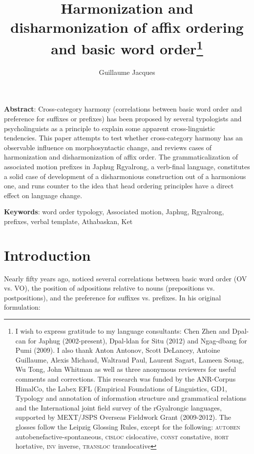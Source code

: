 \documentclass[oldfontcommands,twoside,a4paper,12pt]{article}
\begin{document}
  \title{Harmonization and disharmonization of affix ordering and basic word order\footnote{I wish to express gratitude to my language consultants: Chen Zhen and Dpal-can for Japhug (2002-present), Dpal-ldan for Situ (2012) and Ngag-dbang for Pumi (2009). I also thank Anton Antonov, Scott DeLancey, Antoine Guillaume, Alexis Michaud, Waltraud Paul, Laurent Sagart, Lameen Souag, Wu Tong, John Whitman as well as three anonymous reviewers for useful comments and corrections. This research was funded by the ANR-Corpus HimalCo, the Labex EFL (Empirical Foundations of Linguistics, GD1, Typology and annotation of information structure and grammatical relations and the International joint field survey of the rGyalrongic languages, supported by MEXT/JSPS Overseas Fieldwork Grant (2009-2012). The glosses follow the Leipzig Glossing Rules, except for the following: \textsc{autoben} autobenefactive-spontaneous, \textsc{cisloc} cislocative,  \textsc{const} constative, \textsc{hort} hortative, \textsc{inv} inverse,  \textsc{transloc} translocative}}
 
\author{Guillaume Jacques}
\maketitle


\textbf{Abstract}: Cross-category harmony (correlations between basic word order and preference for suffixes or prefixes) has been proposed by several typologists and psycholinguists as a principle to explain some apparent cross-linguistic tendencies. This paper attempts to test  whether cross-category harmony has an observable  influence on morphosyntactic change, and reviews cases of harmonization and disharmonization of affix order. The grammaticalization of associated motion prefixes in Japhug Rgyalrong, a verb-final language, constitutes a solid case of development of a disharmonious construction out of a harmonious one, and runs counter to the idea that head ordering principles have a direct effect on language change.

\textbf{Keywords}: word order typology, Associated motion, Japhug, Rgyalrong, prefixes, verbal template, Athabaskan, Ket


 

  \section{Introduction}
Nearly fifty years ago, \citet[93]{greenberg66} noticed several correlations between basic word order (OV vs. VO), the position of adpositions relative to nouns (prepositions vs. postpositions), and the preference for  suffixes vs. prefixes.  In his original formulation:
 
\end{document}
